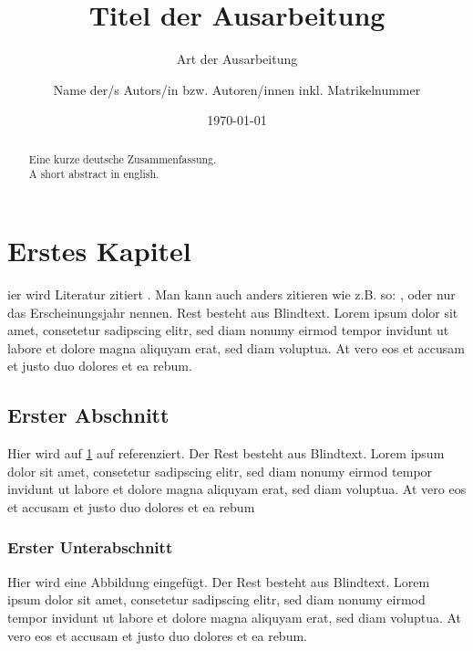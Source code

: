 \documentclass[BCOR=1cm, twoside, ngerman]{scrreprt}
\title{Titel der Ausarbeitung}
\subtitle{Art der Ausarbeitung}
\author{Name der/s Autors/in bzw. Autoren/innen inkl. Matrikelnummer}
\date{\today} %
\begin{document}
\maketitle

\begin{abstract}
Eine kurze deutsche Zusammenfassung.\\

A short abstract in english.
\end{abstract}

\tableofcontents

\chapter{Erstes Kapitel}
\label{chp:kapitel1} %
ier wird Literatur zitiert \cite{lion2010}. Man kann auch anders zitieren wie z.B. so: \textcite{wombat2016}, oder nur das Erscheinungsjahr \citeyear{wikibook} nennen. Rest besteht aus Blindtext. Lorem ipsum dolor sit amet, consetetur sadipscing elitr, sed diam nonumy eirmod tempor invidunt ut labore et dolore magna aliquyam erat, sed diam voluptua. At vero eos et accusam et justo duo dolores et ea rebum.

\section{Erster Abschnitt}
\label{sec:abschnitt1} %
Hier wird auf \cref{chp:kapitel1} auf  referenziert. Der Rest besteht aus Blindtext. Lorem ipsum dolor sit amet, consetetur sadipscing elitr, sed diam nonumy eirmod tempor invidunt ut labore et dolore magna aliquyam erat, sed diam voluptua. At vero eos et accusam et justo duo dolores et ea rebum

\subsection{Erster Unterabschnitt}
\label{subsec:unterabschnitt1} %
Hier wird eine Abbildung eingefügt. Der Rest besteht aus Blindtext. Lorem ipsum dolor sit amet, consetetur sadipscing elitr, sed diam nonumy eirmod tempor invidunt ut labore et dolore magna aliquyam erat, sed diam voluptua. At vero eos et accusam et justo duo dolores et ea rebum.
\end{document}
